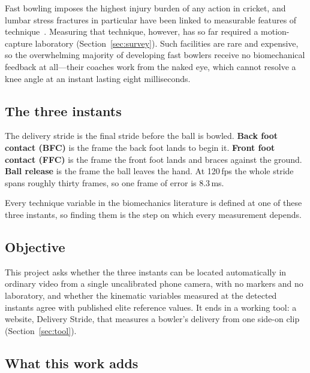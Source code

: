\documentclass[11pt,a4paper]{article}
\begin{document}
Fast bowling imposes the highest injury burden of any action in cricket, and
lumbar stress fractures in particular have been linked to measurable features
of technique~\cite{portus2004}. Measuring that technique, however, has so far
required a motion-capture laboratory (Section~\ref{sec:survey}). Such
facilities are rare and expensive, so the overwhelming majority of developing
fast bowlers receive no biomechanical feedback at all---their coaches work from
the naked eye, which cannot resolve a knee angle at an instant lasting eight
milliseconds.

\subsection{The three instants}

The delivery stride is the final stride before the ball is bowled.
\textbf{Back foot contact (BFC)} is the frame the back foot lands to begin it.
\textbf{Front foot contact (FFC)} is the frame the front foot lands and braces
against the ground. \textbf{Ball release} is the frame the ball leaves the
hand. At 120\,fps the whole stride spans roughly thirty frames, so one frame of
error is 8.3\,ms.

Every technique variable in the biomechanics literature is defined at one of
these three instants, so finding them is the step on which every measurement
depends.

\subsection{Objective}

This project asks whether the three instants can be located automatically in
ordinary video from a single uncalibrated phone camera, with no markers and no
laboratory, and whether the kinematic variables measured at the detected
instants agree with published elite reference values. It ends in a working
tool: a website, Delivery Stride, that measures a bowler's delivery from one
side-on clip (Section~\ref{sec:tool}).

\subsection{What this work adds}
\end{document}
